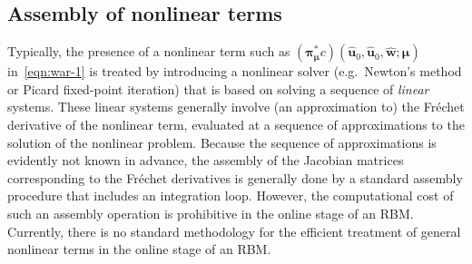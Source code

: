 \documentclass[onecolumn, twoside, a4paper, 11pt]{article}
\begin{document}
\subsection{Assembly of nonlinear terms}

Typically, the presence of a nonlinear term such as $(\bm\pi_{\bm\mu}^* c)(\hat{\bm u}_0,\hat{\bm u}_0,\hat{\bm w};\bm \mu)$ in~\eqref{eqn:war-1} is treated by introducing a nonlinear solver (e.g.~Newton's method or Picard fixed-point
iteration) that is based on solving a sequence of \emph{linear} systems. These linear systems generally involve
(an approximation to) the Fr\'echet derivative of the nonlinear term, evaluated at a sequence of approximations to
the solution of the nonlinear problem. Because the sequence of approximations is evidently not known in advance,
the assembly of the Jacobian matrices corresponding to the Fr\'echet derivatives is generally done by a standard assembly
procedure that includes an integration loop. However, the computational cost of such an assembly operation is prohibitive
in the online stage of an RBM. Currently, there is no standard methodology for the efficient treatment of general
nonlinear terms in the online stage of an RBM.
\end{document}
